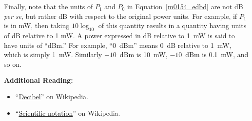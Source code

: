 Finally, note that the units of $P_1$ and $P_0$ in Equation~\ref{m0154_edbd} are not dB \emph{per se}, but rather dB with respect to the original power units.
For example, if $P_1$ is in mW, then taking $10\log_{10}$ of this quantity results in a quantity having units of dB relative to 1 mW.
A power expressed in dB relative to 1~mW is said to have units of ``dBm.''
For example, ``0~dBm'' means 0~dB relative to 1~mW, which is simply 1~mW.
Similarly $+10$~dBm is 10~mW, $-10$~dBm is 0.1~mW, and so on.


{\bf Additional Reading:}
\begin{itemize}
\item ``\href{https://en.wikipedia.org/wiki/Decibel}{Decibel}'' on Wikipedia.
\item ``\href{https://en.wikipedia.org/wiki/Scientific_notation}{Scientific notation}'' on Wikipedia.
\end{itemize}



